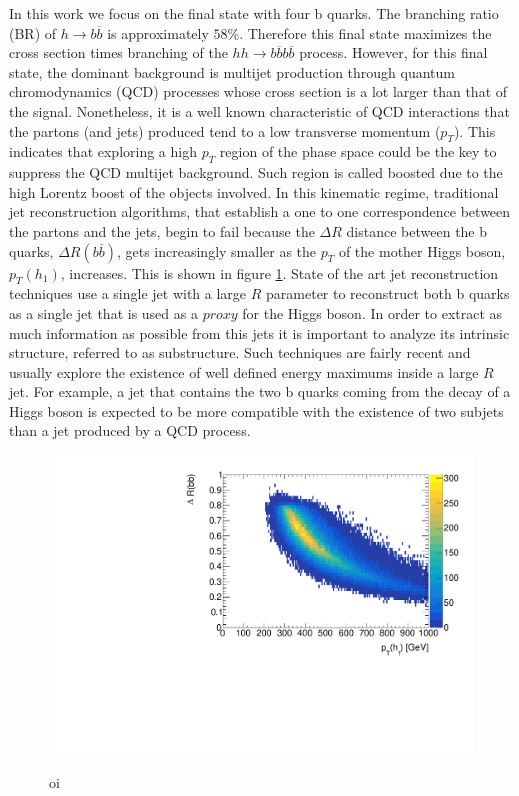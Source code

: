 In this work we focus on the final state with four b quarks. The branching ratio (BR) of $h\rightarrow b\overline{b}$ is approximately $58\%$. Therefore this final state maximizes the cross section times branching of the $hh\rightarrow b\overline{b}b\overline{b}$ process. However, for this final state, the dominant background is multijet production through quantum chromodynamics (QCD) processes whose cross section is a lot larger than that of the signal. Nonetheless, it is a well known characteristic of QCD interactions that the partons (and jets) produced tend to a low transverse momentum ($p_T$). This indicates that exploring a high $p_T$ region of the phase space could be the key to suppress the QCD multijet background. Such region is called boosted due to the high Lorentz boost of the objects involved. In this kinematic regime, traditional jet reconstruction algorithms, that establish a one to one correspondence between the partons and the jets, begin to fail because the $\Delta R$ distance between the b quarks, $\Delta R(b\overline{b})$, gets increasingly smaller as the $p_T$ of the mother Higgs boson, $p_T(h_1)$, increases. This is shown in figure \ref{fig:deltaRbb_pt}. State of the art jet reconstruction techniques use a single jet with a large $R$ parameter to reconstruct both b quarks as a single jet that is used as a $\textit{proxy}$ for the Higgs boson. In order to extract as much information as possible from this jets it is important to analyze its intrinsic structure, referred to as substructure. Such techniques are fairly recent and usually explore the existence of well defined energy maximums inside a large $R$ jet. For example, a jet that contains the two b quarks coming from the decay of a Higgs boson is expected to be more compatible with the existence of two subjets than a jet produced by a QCD process.

\begin{figure}[h]
	\centering
	\includegraphics[trim={.5cm 0 0 0},clip,width=\linewidth]{./images/hist_deltaR_bb_pt.pdf}
	\label{fig:deltaRbb_pt}
	\caption{oi}
\end{figure}

